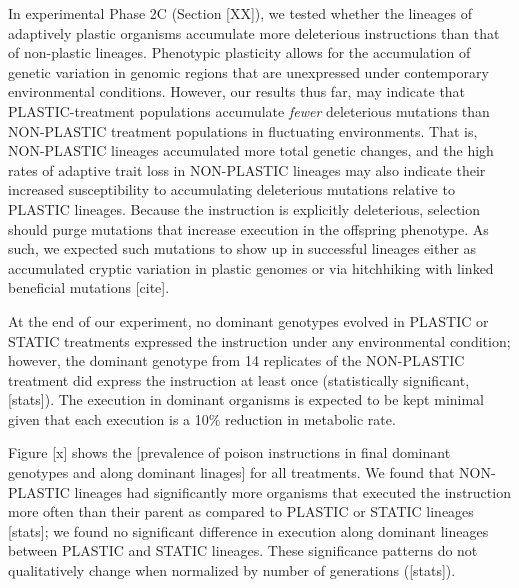 In experimental Phase 2C (Section [XX]), we tested whether the lineages of adaptively plastic organisms accumulate more deleterious  instructions than that of non-plastic lineages.
Phenotypic plasticity allows for the accumulation of genetic variation in genomic regions that are unexpressed under contemporary environmental conditions.
However, our results thus far, may indicate that PLASTIC-treatment populations accumulate \textit{fewer} deleterious mutations than NON-PLASTIC treatment populations in fluctuating environments.
That is, NON-PLASTIC lineages accumulated more total genetic changes, and the high rates of adaptive trait loss in NON-PLASTIC lineages may also indicate their increased susceptibility to accumulating deleterious mutations relative to PLASTIC lineages.
Because the  instruction is explicitly deleterious, selection should purge mutations that increase  execution in the offspring phenotype.
As such, we expected such mutations to show up in successful lineages either as accumulated cryptic variation in plastic genomes or via hitchhiking with linked beneficial mutations [cite].

At the end of our experiment, no dominant genotypes evolved in PLASTIC or STATIC treatments expressed the  instruction under any environmental condition; however, the dominant genotype from 14 replicates of the NON-PLASTIC treatment did express the  instruction at least once (statistically significant, [stats]).
The  execution in dominant organisms is expected to be kept minimal given that each execution is a 10\% reduction in metabolic rate.



Figure [x] shows the [prevalence of poison instructions in final dominant genotypes and along dominant linages] for all treatments.
We found that NON-PLASTIC lineages had significantly more organisms that executed the  instruction more often than their parent as compared to PLASTIC or STATIC lineages [stats]; we found no significant difference in  execution along dominant lineages between PLASTIC and STATIC lineages.
These significance patterns do not qualitatively change when normalized by number of generations ([stats]).

